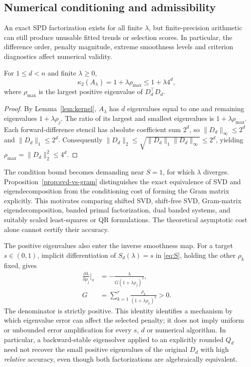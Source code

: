 \subsection{Numerical conditioning and admissibility}
\label{sec:stability}
An exact SPD factorization exists for all finite $\lambda$, but finite-precision arithmetic can still produce unusable fitted trends or selection scores. In particular, the difference order, penalty magnitude, extreme smoothness levels and criterion diagnostics affect numerical validity.

\begin{proposition}\label{prop:conditioning}
For $1\le d<n$ and finite $\lambda\ge0$,
\begin{equation}\label{eq:kappa}
\kappa_2(A_\lambda)=1+\lambda\rho_{\max}
\le 1+\lambda4^d,
\end{equation}
where $\rho_{\max}$ is the largest positive eigenvalue of $D_d^\top D_d$.
\end{proposition}
\begin{proof}
By Lemma~\ref{lem:kernel}, $A_\lambda$ has $d$ eigenvalues equal to one and remaining eigenvalues $1+\lambda\rho_j$. The ratio of its largest and smallest eigenvalues is $1+\lambda\rho_{\max}$. Each forward-difference stencil has absolute coefficient sum $2^d$, so $\|D_d\|_\infty\le2^d$ and $\|D_d\|_1\le2^d$. Consequently $\|D_d\|_2\le\sqrt{\|D_d\|_1\|D_d\|_\infty}\le2^d$, yielding $\rho_{\max}=\|D_d\|_2^2\le4^d$.
\end{proof}

The condition bound becomes demanding near $S=1$, for which $\lambda$ diverges. Proposition~\ref{prop:svd-vs-gram} distinguishes the exact equivalence of SVD and eigendecomposition from the conditioning cost of forming the Gram matrix explicitly. This motivates comparing shifted SVD, shift-free SVD, Gram-matrix eigendecomposition, banded primal factorization, dual banded systems, and suitably scaled least-squares or QR formulations. The theoretical asymptotic cost alone cannot certify their accuracy.

The positive eigenvalues also enter the inverse smoothness map.
For a target $s\in(0,1)$, implicit differentiation of
$S_d(\lambda)=s$ in \eqref{eq:S}, holding the other $\rho_k$
fixed, gives
\begin{equation}\label{eq:sensitivity-svd-eigh}
\begin{aligned}
\frac{\partial\lambda}{\partial\rho_j}\bigg|_s
&=-\frac{\lambda}{G(1+\lambda\rho_j)^2},\\
G&=\sum_{k=1}^{r}
\frac{\rho_k}{(1+\lambda\rho_k)^2}>0.
\end{aligned}
\end{equation}
The denominator is strictly positive. This identity identifies a
mechanism by which eigenvalue error can affect the selected penalty;
it does not imply uniform or unbounded error amplification for every
$s$, $d$ or numerical algorithm. In particular, a backward-stable
eigensolver applied to an explicitly rounded $Q_d$ need not recover
the small positive eigenvalues of the original $D_d$ with high
\emph{relative} accuracy, even though both factorizations are
algebraically equivalent.

